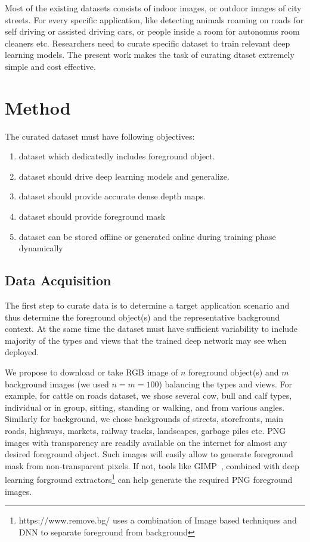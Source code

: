\documentclass[review]{cvpr}
\begin{document}
Most of the existing datasets consists of indoor images, or outdoor images of city streets. For every specific application, like detecting animals roaming on roads for self driving or assisted driving cars, or people inside a room for autonomus room cleaners etc. Researchers need to curate specific dataset to train relevant deep learning models. The present work makes the task of curating dtaset extremely simple and cost effective.

\section{Method}
The curated dataset must have following objectives:
\begin{enumerate}
\item dataset which dedicatedly includes foreground object. 
\item dataset should drive deep learning models and generalize. 
\item dataset should provide accurate dense depth maps.
\item dataset should provide foreground mask
\item dataset can be stored offline or generated online during training phase dynamically
\end{enumerate}

\subsection{Data Acquisition}
The first step to curate data is to determine a target application scenario and thus determine the foreground object(s) and the representative background context. At the same time the dataset must have sufficient variability to include majority of the types and views that the trained deep network may see when deployed.

We propose to download or take RGB image of $n$ foreground object(s) and $m$ background images (we used $n=m=100$) balancing the types and views. For example, for cattle on roads dataset, we shose several cow, bull and calf types, individual  or in group, sitting, standing or walking, and from various angles. Similarly for background, we chose backgrounds of streets,  storefronts, main roads, highways, markets, railway tracks, landscapes, garbage piles etc. PNG images with transparency are readily available on the internet for almost any desired foreground object. Such images will easily allow to generate foreground mask from non-transparent pixels. If not, tools like GIMP~\cite{howat2014greenland}, combined with deep learning forground extractors\footnote{https://www.remove.bg/ uses a combination of Image based techniques and DNN to separate foreground from background} can help generate the required PNG foreground images.
\end{document}
